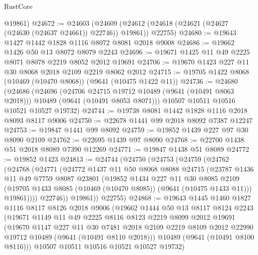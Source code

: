 \begin{lexlean}{RustCore}
\begin{coremodule}
      @19861)
@24672 := @24603
    (@24609 (@24612 (@24618 (@24621 (@24627 (@24630 (@24637 @24661)) @22746)) @19861)) @22755)
@24680 := @19643 @1427 @1442 @1828 @1116 @8072 @8081 @2018 @9008
@24686 := @19662 @1426 @50 @13 @8072 @8079 @2243
@24696 := @19671 @1425 @11 @49 @2225 @8071 @8078 @2219 @8052 @2012 @19691
@24706 := @19670 @1423 @227 @11 @30 @8068 @2018 @2109 @2219 @8062 @2012
@24715 := @19705 @1422 @8068 (@10469 (@10470 @8068)) (@9641 (@10475 @1422 @11))
@24736 := @24680
    (@24686
      (@24696
        (@24706 @24715 @19712 @10489 (@9641 (@10491 @8063 @2018)))
        @10489
        (@9641 (@10491 @8053 @8071)))
      @10507
      @10511
      @10516
      @10521
      @10527
      @19732)
@24744 := @19738 @8081 @1442 @1828 @1116 @2018 @8093 @8117 @9006
@24750 := @22678 @1441 @99 @2018 @8092 @7387 @12247
@24753 := @19847 @1441 @99 @8092
@24759 := @19852 @1439 @227 @97 @30 @8090 @2109
@24762 := @22695 @1439 @97 @8090
@24768 := @22700 @1438 @51 @2018 @8089 @7390 @12269
@24771 := @19847 @1438 @51 @8089
@24772 := @19852 @1423
@24813 := @24744
    (@24750
      (@24753
        (@24759
          (@24762
            (@24768
              (@24771
                (@24772
                  @1437
                  @11
                  @50
                  @8068
                  @8088
                  @24715
                  (@23787
                    @1436
                    @11
                    @49
                    @7759
                    @8087
                    @23801
                    (@19852
                      @1434
                      @227
                      @11
                      @30
                      @8085
                      @2109
                      (@19705 @1433 @8085 (@10469 (@10470 @8085)) (@9641 (@10475 @1433 @11)))
                      @19861))))
              @22746))
          @19861))
      @22755)
@24868 := @19643
    @1445
    @1460
    @1827
    @1116
    @8117
    @8126
    @2018
    @9006
    (@19662
      @1444
      @50
      @13
      @8117
      @8124
      @2243
      (@19671
        @1149
        @11
        @49
        @2225
        @8116
        @8123
        @2219
        @8099
        @2012
        @19691
        (@19670
          @1147
          @227
          @11
          @30
          @7481
          @2018
          @2109
          @2219
          @8109
          @2012
          @22990
          @19712
          @10489
          (@9641 (@10491 @8110 @2018)))
        @10489
        (@9641 (@10491 @8100 @8116)))
      @10507
      @10511
      @10516
      @10521
      @10527
      @19732)

\end{coremodule}
\end{lexlean}
